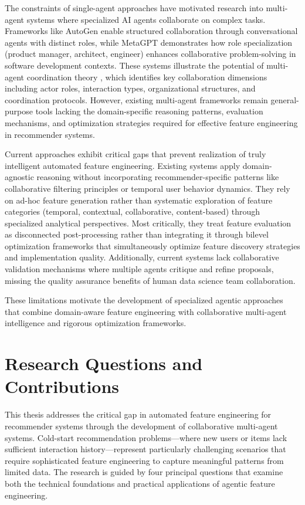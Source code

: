 The constraints of single-agent approaches have motivated research into multi-agent systems where specialized AI agents collaborate on complex tasks. Frameworks like AutoGen \cite{wu2023autogen} enable structured collaboration through conversational agents with distinct roles, while MetaGPT \cite{hong2023metagpt} demonstrates how role specialization (product manager, architect, engineer) enhances collaborative problem-solving in software development contexts. These systems illustrate the potential of multi-agent coordination theory \cite{tran2025multiagent}, which identifies key collaboration dimensions including actor roles, interaction types, organizational structures, and coordination protocols. However, existing multi-agent frameworks remain general-purpose tools lacking the domain-specific reasoning patterns, evaluation mechanisms, and optimization strategies required for effective feature engineering in recommender systems.

Current approaches exhibit critical gaps that prevent realization of truly intelligent automated feature engineering. Existing systems apply domain-agnostic reasoning without incorporating recommender-specific patterns like collaborative filtering principles or temporal user behavior dynamics. They rely on ad-hoc feature generation rather than systematic exploration of feature categories (temporal, contextual, collaborative, content-based) through specialized analytical perspectives. Most critically, they treat feature evaluation as disconnected post-processing rather than integrating it through bilevel optimization frameworks that simultaneously optimize feature discovery strategies and implementation quality. Additionally, current systems lack collaborative validation mechanisms where multiple agents critique and refine proposals, missing the quality assurance benefits of human data science team collaboration.


These limitations motivate the development of specialized agentic approaches that combine domain-aware feature engineering with collaborative multi-agent intelligence and rigorous optimization frameworks. 



\section{Research Questions and Contributions}

This thesis addresses the critical gap in automated feature engineering for recommender systems through the development of collaborative multi-agent systems. Cold-start recommendation problems—where new users or items lack sufficient interaction history—represent particularly challenging scenarios that require sophisticated feature engineering to capture meaningful patterns from limited data. The research is guided by four principal questions that examine both the technical foundations and practical applications of agentic feature engineering.

